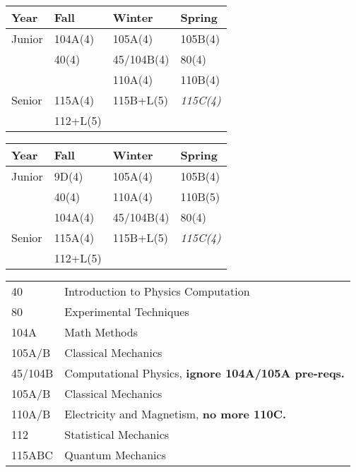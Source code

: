 \documentclass[12pt]{article}
\begin{document}
\newpage

\label{tbl:proposed-nonhonors}
\begin{center}
\begin{tabular}{|l|l|l|l|}
\hline
Year      & Fall    & Winter & Spring \\
\hline
Junior & 104A(4)  & 105A(4)   & 105B(4) \\
       & 40(4)    & 45/104B(4)   & 80(4)   \\
       &          & 110A(4)   & 110B(4) \\
Senior & 115A(4)  & 115B+L(5) & {\it 115C(4)} \\
       & 112+L(5) &  & \\
\hline 
\end{tabular}
\end{center}


\label{tbl:proposed-nonhonors}
\begin{center}
\begin{tabular}{|l|l|l|l|}
\hline
Year      & Fall    & Winter & Spring \\
\hline
Junior   & 9D(4)         & 105A(4)   & 105B(4) \\
         & 40(4)         & 110A(4)   & 110B(5) \\         
         & 104A(4)       & 45/104B(4)     & 80(4) \\
\hline
Senior   & 115A(4)    & 115B+L(5)      & {\it 115C(4)} \\
         & 112+L(5)   & & \\
\hline 
\end{tabular}
\end{center}

\begin{center}
\begin{tabular}{|l|l|}
\hline
40 & Introduction to Physics Computation \\ 
80 & Experimental Techniques \\
104A & Math Methods \\
105A/B & Classical Mechanics \\
45/104B & Computational Physics, {\bf ignore 104A/105A pre-reqs.} \\
105A/B & Classical Mechanics \\
110A/B & Electricity and Magnetism, \bf no more 110C. \\
112 & Statistical Mechanics \\
115ABC & Quantum Mechanics \\
\hline
\end{tabular}
\end{center}
\end{document}
